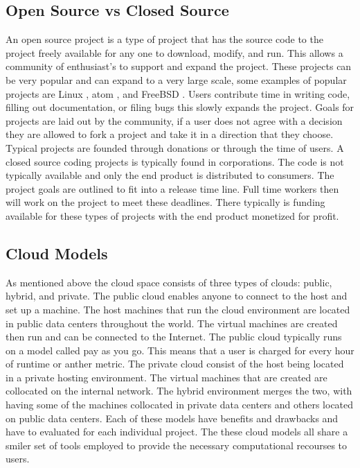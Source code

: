 \documentclass[12pt]{article}
\begin{document}
\subsection{Open Source vs Closed Source}
An open source project is a type of project that has the source code to the project freely available for any one to download, modify, and run. This allows a community of enthusiast's to support and expand the project. These projects can be very popular and can expand to a very large scale, some examples of popular projects are Linux \cite{Linux}, atom \cite{atom}, and FreeBSD \cite{freebsd}. Users contribute time in writing code, filling out documentation, or filing bugs this slowly expands the project. Goals for projects are laid out by the community, if a user does not agree with a decision they are allowed to fork a project and take it in a direction that they choose.  Typical projects are founded through donations or through the time of users.  A closed source coding projects is typically found in corporations. The code is not typically available and only the end product is distributed to consumers. The project goals are outlined to fit into a release time line. Full time workers then will work on the project to meet these deadlines. There typically is funding available for these types of projects with the end product monetized for profit.

\subsection{Cloud Models}
As mentioned above the cloud space consists of three types of clouds: public, hybrid, and private. The public cloud enables anyone to connect to the host and set up a machine. The host machines that run the cloud environment are located in public data centers throughout the world. The virtual machines are created then run and can be connected to the Internet. The public cloud typically runs on a model called pay as you go. This means that a user is charged for every hour of runtime or anther metric. The private cloud consist of the host being located in a private hosting environment. The virtual machines that are created are collocated on the internal network. The hybrid environment merges the two, with having some of the machines collocated in private data centers and others located on public data centers. Each of these models have benefits and drawbacks and have to evaluated for each individual project. The these cloud models all share a smiler set of tools employed to provide the necessary computational recourses to users.
\end{document}
